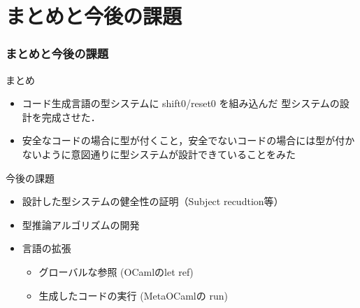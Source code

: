\section{まとめと今後の課題}

\begin{frame}
  \frametitle{まとめと今後の課題}
  まとめ
  \begin{itemize}
  \item コード生成言語の型システムに shift0/reset0 を組み込んだ 型システムの設計を完成させた．
  \item 安全なコードの場合に型が付くこと，安全でないコードの場合には型が付かないように意図通りに型システムが設計できていることをみた
  \end{itemize}

  \vspace{\baselineskip}

  今後の課題
  \begin{itemize}
  \item 設計した型システムの健全性の証明（Subject recudtion等）
  \item 型推論アルゴリズムの開発
  \item 言語の拡張
    \begin{itemize}
    \item グローバルな参照 (OCamlのlet ref)
    \item 生成したコードの実行 (MetaOCamlの run)
    \end{itemize}
  \end{itemize}
\end{frame}

